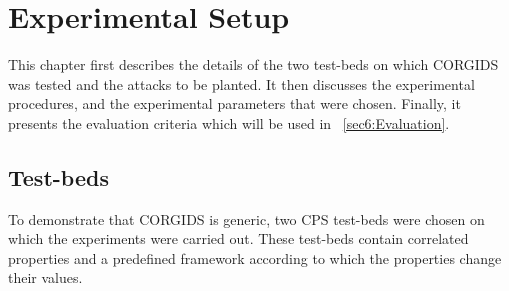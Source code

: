 
\chapter{\textbf{Experimental Setup}}
\label{sec4:ExperimentalDetail}

This chapter first describes the details of the two test-beds on which \ac{CORGIDS} was tested and the attacks to be planted. It then discusses the experimental procedures, and the experimental parameters that were chosen. Finally, it presents the evaluation criteria which will be used in ~\autoref{sec6:Evaluation}.

\section{Test-beds}
To demonstrate that \ac{CORGIDS} is generic, two \ac{CPS} test-beds were chosen on which the experiments were carried out. These test-beds contain correlated properties and a predefined framework according to which the properties change their values. 

